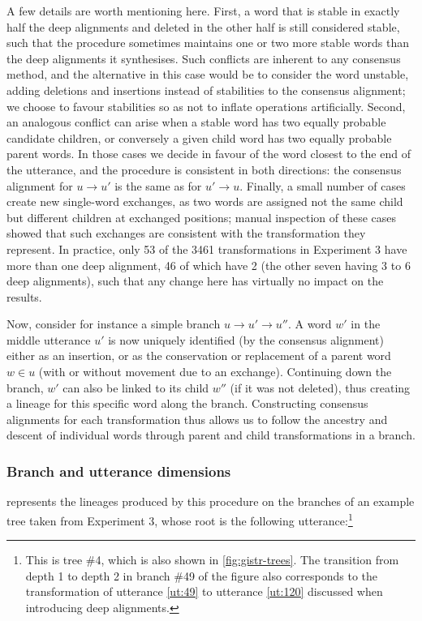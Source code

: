 A few details are worth mentioning here. First, a word that is stable in
exactly half the deep alignments and deleted in the other half is still
considered stable, such that the procedure sometimes maintains one or
two more stable words than the deep alignments it synthesises. Such
conflicts are inherent to any consensus method, and the alternative in
this case would be to consider the word unstable, adding deletions and
insertions instead of stabilities to the consensus alignment; we choose
to favour stabilities so as not to inflate operations artificially.
Second, an analogous conflict can arise when a stable word has two
equally probable candidate children, or conversely a given child word
has two equally probable parent words. In those cases we decide in
favour of the word closest to the end of the utterance, and the
procedure is consistent in both directions: the consensus alignment for
\(u \rightarrow u'\) is the same as for \(u' \rightarrow u\). Finally, a
small number of cases create new single-word exchanges, as two words are
assigned not the same child but different children at exchanged
positions; manual inspection of these cases showed that such exchanges
are consistent with the transformation they represent. In practice, only
53 of the 3461 transformations in Experiment 3 have more than one deep
alignment, 46 of which have 2 (the other seven having 3 to 6 deep
alignments), such that any change here has virtually no impact on the
results.

Now, consider for instance a simple branch
\(u \rightarrow u' \rightarrow u''\). A word \(w'\) in the middle
utterance \(u'\) is now uniquely identified (by the consensus alignment)
either as an insertion, or as the conservation or replacement of a
parent word \(w \in u\) (with or without movement due to an exchange).
Continuing down the branch, \(w'\) can also be linked to its child
\(w''\) (if it was not deleted), thus creating a lineage for this
specific word along the branch. Constructing consensus alignments for
each transformation thus allows us to follow the ancestry and descent of
individual words through parent and child transformations in a branch.

\subsubsection{Branch and utterance
dimensions}\label{branch-and-utterance-dimensions}

 represents the lineages produced by this
procedure on the branches of an example tree taken from Experiment 3,
whose root is the following utterance:\footnote{This is tree \#4, which
  is also shown in \cref{fig:gistr-trees}. The transition from depth 1
  to depth 2 in branch \#49 of the figure also corresponds to the
  transformation of utterance \ref{ut:49} to utterance \ref{ut:120}
  discussed when introducing deep alignments.}


